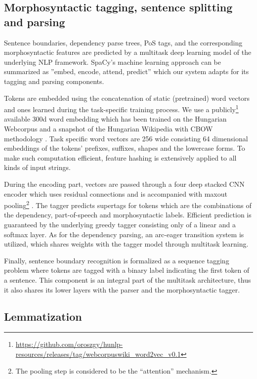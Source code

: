 \documentclass{llncs}
\begin{document}
\subsection{Morphosyntactic tagging, sentence splitting and parsing}
\label{sec:tagging}

Sentence boundaries, dependency parse trees, PoS tags, and the corresponding morphosyntactic features are predicted by a multitask deep learning model of the underlying NLP framework. SpaCy’s machine learning approach can be summarized as ''embed, encode, attend, predict''  \citep{spacy-neural-model} which our system adapts for its tagging and parsing components.

Tokens are embedded using the concatenation of static (pretrained) word vectors and ones learned during the task-specific training process. We use a publicly\footnote{\url{https://github.com/oroszgy/hunlp-resources/releases/tag/webcorpuswiki_word2vec_v0.1}} available 300d word embedding which has been trained on the Hungarian Webcorpus \citep{HunWebCorpus} and a snapshot of the Hungarian Wikipedia with CBOW methodology \citep{word2vec}. Task specific word vectors are 256 wide consisting 64 dimensional embeddings of the tokens’ prefixes, suffixes, shapes and the lowercase forms. To make such computation efficient, feature hashing is extensively applied to all kinds of input strings. 

During the encoding part, vectors are passed through a four deep stacked CNN encoder \citep{cnn} which uses residual connections and is accompanied with maxout pooling\footnote{The pooling step is considered to be the “attention” mechanism.} \citep{spacy-parser2}. The tagger predicts supertags for tokens which are the combinations of the dependency, part-of-speech and morphosyntactic labels. Efficient prediction is guaranteed by the underlying greedy tagger consisting only of a linear and a softmax layer. As for the dependency parsing, an arc-eager transition system \citep{spacy-parser} is utilized, which shares weights with the tagger model through multitask learning. 

Finally, sentence boundary recognition is formalized as a sequence tagging problem where tokens are tagged with a binary label indicating the first token of a sentence. This component is an integral part of the multitask architecture, thus it also shares its lower layers with the parser and the morphosyntactic tagger.

\subsection{Lemmatization}
\end{document}
